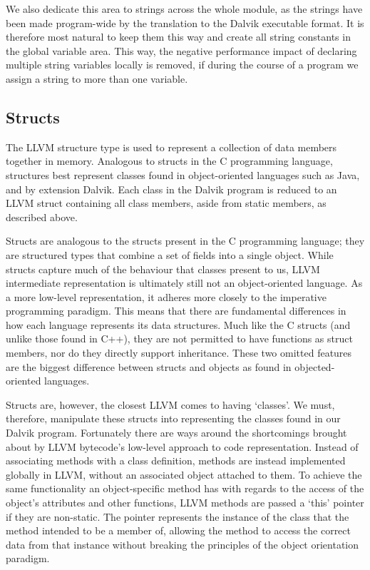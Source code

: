 We also dedicate this area to strings across the whole module, as the strings have been made program-wide by the translation to the Dalvik executable format. It is therefore most natural to keep them this way and create all string constants in the global variable area. This way, the negative performance impact of declaring multiple string variables locally is removed, if during the course of a program we assign a string to more than one variable.

\subsection*{Structs}

The LLVM structure type is used to represent a collection of data members together in memory. Analogous to structs in the C programming language, structures best represent classes found in object-oriented languages such as Java, and by extension Dalvik. Each class in the Dalvik program is reduced to an LLVM struct containing all class members, aside from static members, as described above.

Structs are analogous to the structs present in the C programming language; they are structured types that combine a set of fields into a single object. While structs capture much of the behaviour that classes present to us, LLVM intermediate representation is ultimately still not an object-oriented language. As a more low-level representation, it adheres more closely to the imperative programming paradigm. This means that there are fundamental differences in how each language represents its data structures. Much like the C structs (and unlike those found in C++), they are not permitted to have functions as struct members, nor do they directly support inheritance. These two omitted features are the biggest difference between structs and objects as found in objected-oriented languages.

Structs are, however, the closest LLVM comes to having `classes'. We must, therefore, manipulate these structs into representing the classes found in our Dalvik program. Fortunately there are ways around the shortcomings brought about by LLVM bytecode's low-level approach to code representation. Instead of associating methods with a class definition, methods are instead implemented globally in LLVM, without an associated object attached to them. To achieve the same functionality an object-specific method has with regards to the access of the object's attributes and other functions, LLVM methods are passed a `this' pointer if they are non-static. The pointer represents the instance of the class that the method intended to be a member of, allowing the method to access the correct data from that instance without breaking the principles of the object orientation paradigm.

